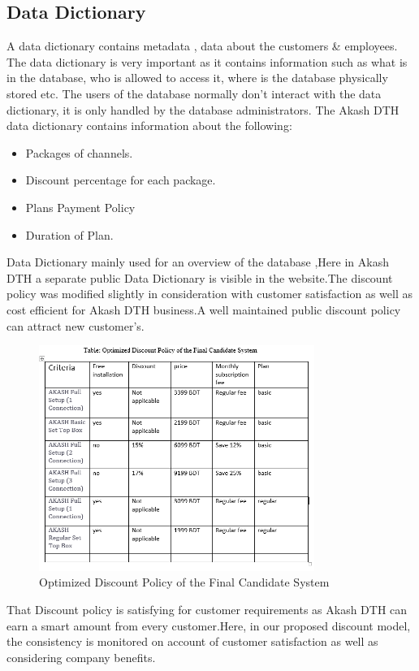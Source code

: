 \begin{spacing}{1}
\newpage
\subsection{Data Dictionary}
A data dictionary contains metadata , data about the customers \& employees. The data dictionary is very important as it contains information such as what is in the database, who is allowed to access it, where is the database physically stored etc. The users of the database normally don't interact with the data dictionary, it is only handled by the database administrators.
The Akash DTH data dictionary  contains information about the following:
\begin{itemize}
	\item Packages of channels. 
	\item Discount percentage for each package.
	\item Plans Payment Policy 
	\item Duration of Plan.
\end{itemize}
Data Dictionary mainly used for an overview of the database ,Here in Akash DTH a separate public Data Dictionary is visible in the website.The discount policy was modified slightly in consideration with customer satisfaction as well as cost efficient for Akash DTH business.A well maintained public discount policy can attract new customer’s.

\begin{figure}[H]
	\centering
	\includegraphics[width=0.8\textwidth]{table}
	\caption{Optimized Discount Policy of the Final Candidate System}
	\label{fig:table41}
\end{figure}

That Discount policy is satisfying for customer requirements as Akash DTH can earn a smart amount from every customer.Here, in our proposed discount model, the consistency is monitored on account of customer satisfaction as well as considering company benefits.


\end{spacing}
